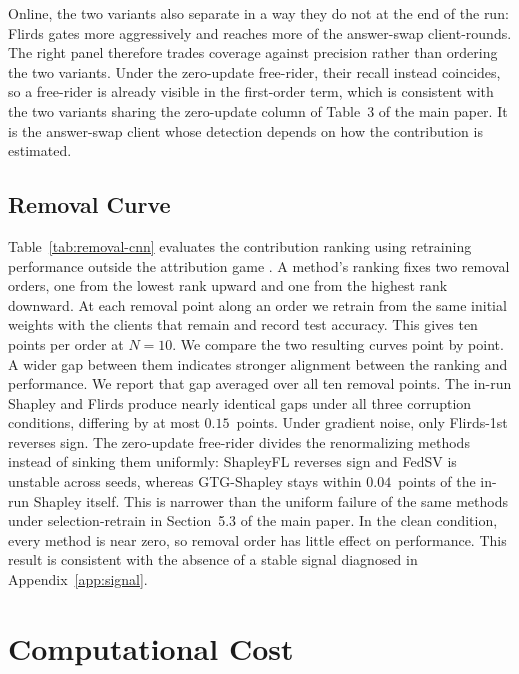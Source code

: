 \documentclass[letterpaper]{article} %
\theoremstyle{definition}
\begin{document}
Online, the two variants also separate in a way they do not at the end of the
run: Flirds gates more aggressively and reaches more of the answer-swap
client-rounds. The right panel therefore trades coverage against precision
rather than ordering the two variants. Under the zero-update free-rider, their recall
instead coincides, so a free-rider is already visible in the first-order term,
which is consistent with the two variants sharing the zero-update column of
Table~3 of the main paper. It is the answer-swap client whose detection
depends on how the contribution is estimated.

\subsection{Removal Curve}
\label{app:removal}

Table~\ref{tab:removal-cnn} evaluates the contribution ranking using
retraining performance outside the attribution game \citep{jia2019towards}. A
method's ranking fixes two removal orders, one from the lowest rank upward and
one from the highest rank downward. At each removal point along an order we
retrain from the same initial weights with the clients that remain and record
test accuracy. This gives ten points per order at $N{=}10$. We compare the two
resulting curves point by point. A wider gap between them
indicates stronger alignment between the ranking and
performance. We report that gap averaged over all ten removal points. The
in-run Shapley and Flirds produce nearly identical gaps
under all three corruption conditions, differing by at most $0.15$~points.
Under gradient noise, only Flirds-1st reverses sign.
The zero-update free-rider divides the renormalizing methods instead of
sinking them uniformly: ShapleyFL reverses sign and FedSV is unstable across
seeds, whereas GTG-Shapley stays within $0.04$~points
of the in-run Shapley itself. This is narrower than the uniform failure of the
same methods under selection-retrain in
Section~5.3 of the main paper.
In the clean condition, every method is near zero, so removal
order has little effect on performance. This result is consistent with the
absence of a stable signal diagnosed in
Appendix~\ref{app:signal}.

\section{Computational Cost}
\label{app:cost}
\end{document}
